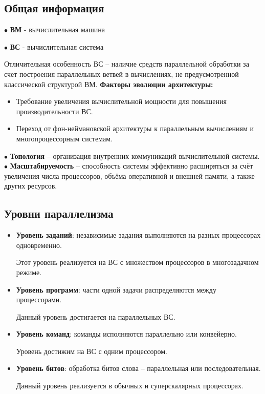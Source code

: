 	\subsection{Общая информация}
	$\bullet$ \textbf{ВМ} - вычислительная машина
	\par
	$\bullet$ \textbf{ВС} - вычислительная система
	\par
	Отличительная особенность ВС -- наличие средств параллельной обработки за счет построения параллельных ветвей в вычислениях, не предусмотренной классической структурой ВМ.
	\newline
	\textbf{Факторы эволюции архитектуры:}
	\begin{itemize}
		\item Требование увеличения вычислительной мощности для повышения производительности ВС.
		\item Переход от фон-неймановской архитектуры к параллельным вычислениям и многопроцессорным системам.
	\end{itemize}
	
	$\bullet$ \textbf{Топология} -- организация внутренних коммуникаций вычислительной системы.
	\newline
	$\bullet$ \textbf{Масштабируемость} -- способность системы эффективно расширяться за счёт увеличения числа процессоров, объёма оперативной и внешней памяти, а также других ресурсов.
	
	\subsection{Уровни параллелизма}
	\begin{itemize}
		\item \textbf{Уровень заданий}: независимые задания выполняются на разных процессорах одновременно.
		\par
		Этот уровень реализуется на ВС с множеством процессоров в многозадачном режиме. 
		\item \textbf{Уровень программ}: части одной задачи распределяются между процессорами.
		\par
		Данный уровень достигается на параллельных ВС.
		\item \textbf{Уровень команд}: команды исполняются параллельно или конвейерно.
		\par
		Уровень достижим на ВС с одним процессором.
		\item \textbf{Уровень битов}: обработка битов слова -- параллельная или последовательная.
		\par
		Данный уровень реализуется в обычных и суперскалярных процессорах. 
	\end{itemize}
	
